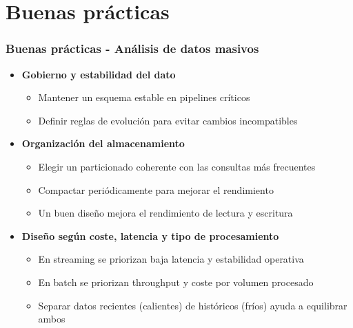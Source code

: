 \documentclass[aspectratio=169]{beamer}
\begin{document}
\section{Buenas prácticas}


\begin{frame}\frametitle{Buenas prácticas - Análisis de datos masivos}
\begin{itemize}
  \item \textbf{Gobierno y estabilidad del dato}
  \begin{itemize}
    \item Mantener un esquema estable en pipelines críticos
    \item Definir reglas de evolución para evitar cambios incompatibles
  \end{itemize}

  \vspace{0.8em}

  \item \textbf{Organización del almacenamiento}
  \begin{itemize}
    \item Elegir un particionado coherente con las consultas más frecuentes
    \item Compactar periódicamente para mejorar el rendimiento
    \item Un buen diseño mejora el rendimiento de lectura y escritura
  \end{itemize}

  \vspace{0.8em}

  \item \textbf{Diseño según coste, latencia y tipo de procesamiento}
  \begin{itemize}
    \item En streaming se priorizan baja latencia y estabilidad operativa
    \item En batch se priorizan throughput y coste por volumen procesado
    \item Separar datos recientes (calientes) de históricos (fríos) ayuda a equilibrar ambos
  \end{itemize}
\end{itemize}
\end{frame}
\end{document}
